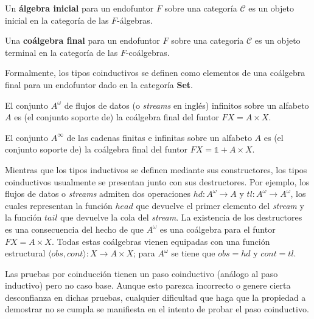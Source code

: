 \begin{definition}
Un \textbf{álgebra inicial} para un endofuntor $\mathit{F}$ sobre una categoría $\mathscr{C}$ es un objeto inicial en la categoría de las $\mathit{F}$-álgebras.
\end{definition}

\begin{definition}
Una \textbf{coálgebra final} para un endofuntor $\mathit{F}$ sobre una categoría $\mathscr{C}$ es un objeto terminal en la categoría de las $\mathit{F}$-coálgebras. 
\end{definition}

Formalmente, los tipos coinductivos se definen como elementos de una coálgebra final para un endofuntor dado en la categoría \textbf{Set}. 

\begin{ejemplo}
El conjunto $A^{\omega}$ de flujos de datos (o \textit{streams} en inglés) infinitos sobre un alfabeto $A$ es (el conjunto soporte de) la coálgebra final del funtor $\mathit{F}X = A \times X$.
\end{ejemplo}

\begin{ejemplo}
El conjunto $A^{\infty}$ de las cadenas finitas e infinitas sobre un alfabeto $A$ es (el conjunto soporte de) la coálgebra final del funtor $\mathit{F}X = \mathds{1} + A \times X$.
\end{ejemplo}

Mientras que los tipos inductivos se definen mediante sus constructores, los tipos coinductivos usualmente se presentan junto con sus destructores. Por ejemplo, los flujos de datos o \textit{streams} admiten dos operaciones $hd: A^{\omega} \rightarrow A$ y $tl : A^{\omega} \rightarrow A^{\omega}$, los cuales representan la función $head$ que devuelve el primer elemento del \textit{stream} y la función $tail$ que devuelve la cola del \textit{stream}. La existencia de los destructores es una consecuencia del hecho de que $A^{\omega}$ es una coálgebra para el funtor $\mathit{F}X = A \times X$. Todas estas coálgebras vienen equipadas con una función estructural $\langle obs, cont \rangle  : X \rightarrow A \times X$; para $A^{\omega}$ se tiene que $obs = hd$ y $cont = tl$.

Las pruebas por coinducción tienen un paso coinductivo (análogo al paso inductivo) pero no caso base. Aunque esto parezca incorrecto o genere cierta desconfianza en dichas pruebas, cualquier dificultad que haga que la propiedad a demostrar no se cumpla se manifiesta en el intento de probar el paso coinductivo.


